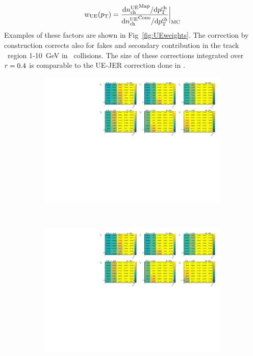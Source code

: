 \begin{eqnarray}
w_{\mathrm{UE}} (\mbox{$p_{\mathrm{T}}$}) = \frac{\mathrm{d} \mbox{$n_{\mathrm{ch}}^{\mathrm{UE}}$}^{\mathrm{Map}}/ \mathrm{d} \mbox{$p_{{\mathrm{T}}}^{\mathrm{ch}}$}}{\mathrm{d} \mbox{$n_{\mathrm{ch}}^{\mathrm{UE}}$}^{\mathrm{Cone}}/ \mathrm{d} \mbox{$p_{{\mathrm{T}}}^{\mathrm{ch}}$}}\bigg|_{\mathrm{MC}}
\end{eqnarray}   
Examples of these factors are shown in Fig~\ref{fig:UEweights}.
The correction by construction corrects also for fakes and secondary contribution in the track \pT\ region 1-10~GeV in \PbPb\ collisions.
The size of these corrections integrated over $\mbox{$r$} = 0.4$ is comparable to the UE-JER correction done in \cite{PhysRevC.98.024908}.

\begin{figure}
\begin{subfigure}{1.\textwidth}
\centering \includegraphics[page=2,width=1.\textwidth]{figures/main/UE/UE_factors.pdf}
\caption{}
\label{fig:UEweights_r2}
\end{subfigure} \\
\begin{subfigure}{1.\textwidth}
\centering \includegraphics[page=6,width=1.\textwidth]{figures/main/UE/UE_factors.pdf}

\end{subfigure}
\end{figure}
